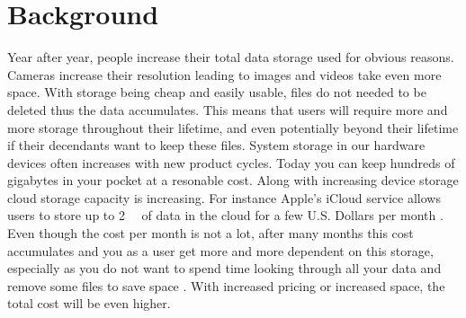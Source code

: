 \section{Background}
\label{sec:background}


Year after year, people increase their total data storage used for obvious reasons. Cameras increase their resolution leading to images and videos take even more space. With storage being cheap and easily usable, files do not needed to be deleted thus the data accumulates. %
This means that users will require more and more storage throughout their lifetime, and even potentially beyond their lifetime if their decendants want to keep these files. System storage in our hardware devices often increases with new product cycles. Today you can keep hundreds of gigabytes in your pocket at a resonable cost.%
Along with increasing device storage cloud storage capacity is increasing. For instance Apple's iCloud service allows users to store up to \SI{2}{\tera\byte} of data in the cloud for a few U.S. Dollars per month %
. Even though the cost per month is not a lot, after many months this cost accumulates and you as a user get more and more dependent on this storage, especially as you do not want to spend time looking through all your data and remove some files to save space %
. With increased pricing or increased space, the total cost will be even higher.

